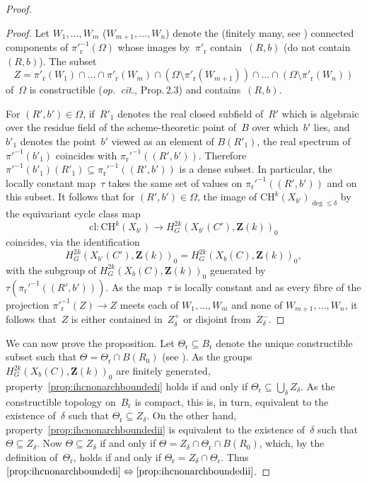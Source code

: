 \documentclass[JEP,XML,SOM,Unicode]{cedram}
\theoremstyle{plain}
\theoremstyle{definition}
\numberwithin{equation}{section}
\newcommand{\cl}{{\mathrm{cl}}}
\newcommand{\rs}{{\mathrm{r}}}
\newcommand{\Z}{{\mathbf Z}}
\newcommand{\CH}{\mathrm{CH}}
\begin{document}
\begin{proof}
\begin{proof}
Let $W_1,\dots,W_m$ (\resp $W_{m+1},\dots,W_n$) denote the (finitely many,
see \cite[Cor.\,3.7]{costeroyspectrereel}) connected components of $\pi'^{-1}_\rs(\Omega)$
whose images by~$\pi'_\rs$ contain~$(R,b)$ (\resp do not contain~$(R,b)$).
The subset
\[
Z = \pi'_\rs(W_1) \cap \dots \cap \pi'_\rs (W_m) \cap (\Omega \setminus \pi'_\rs(W_{m+1})) \cap \dots \cap \left(\Omega \setminus \pi'_\rs(W_n)\right)
\]
of~$\Omega$ is constructible (\emph{op.\ cit.}, Prop.\,2.3)
and contains~$(R,b)$.

For $(R',b') \in \Omega$,
if~$R'_1$ denotes the real closed subfield of~$R'$ which is algebraic over
the residue field of the scheme-theoretic point of~$B$
over which~$b'$ lies, and~$b'_1$ denotes the point~$b'$ viewed as an element of $B(R'_1)$,
the real spectrum of $\pi'^{-1}(b'_1)$
coincides with $\pi_\rs'^{-1}((R',b'))$.
Therefore $\pi'^{-1}(b'_1)(R'_1) \subseteq \pi_\rs'^{-1}((R',b'))$ is a dense subset.
In particular, the locally constant map~$\tau$ takes the same set of values
on $\pi_\rs'^{-1}((R',b'))$ and on this subset.
It follows that
for $(R',b') \in \Omega$, the image of
$\CH^k(X_{b'})_{\deg\leq\delta}$ by
the equivariant cycle class map
\[
\cl:\CH^k(X_{b'}) \to H^{2k}_G(X_{b'}(C'),\Z(k))_0
\]
coincides, via the identification
\[
H^{2k}_G(X_{b'}(C'),\Z(k))_0=H^{2k}_G(X_b(C),\Z(k))_0,
\]
with the subgroup of
$H^{2k}_G(X_b(C),\Z(k))_0$
generated by $\tau(\pi_\rs'^{-1}((R',b')))$.
As the map~$\tau$ is locally constant
and as every fibre of the projection $\pi'^{-1}_\rs(Z) \to Z$
meets each of $W_1,\dots,W_m$
and none of $W_{m+1},\dots,W_n$,
it follows that~$Z$ is either contained in~$Z_\delta^+$ or disjoint from~$Z_\delta^-$.
\end{proof}

We can now prove the proposition.
Let $\Theta_\rs \subseteq B_\rs$ denote the unique constructible subset such that
$\Theta=\Theta_\rs \cap B(R_0)$
(see \cite[Prop.\,7.2.2\,(i)]{bcr}).
As the groups $H^{2k}_G(X_b(C),\Z(k))_0$ are finitely generated,
property~\eqref{prop:ihcnonarchboundedi} holds if and only if $\Theta_\rs \subseteq \bigcup_\delta Z_\delta$.
As the constructible topology on~$B_\rs$ is compact,
this is, in turn, equivalent to the existence of~$\delta$ such that $\Theta_\rs \subseteq Z_\delta$.
On the other hand, property~\eqref{prop:ihcnonarchboundedii} is equivalent to the existence of~$\delta$
such that $\Theta \subseteq Z_\delta$.
Now $\Theta \subseteq Z_\delta$ if and only if $\Theta=Z_\delta \cap \Theta_\rs \cap B(R_0)$,
which, by the definition of~$\Theta_\rs$, holds if and only if $\Theta_\rs=Z_\delta \cap \Theta_\rs$.
Thus $\eqref{prop:ihcnonarchboundedi}\Leftrightarrow\eqref{prop:ihcnonarchboundedii}$.
\end{proof}
\end{document}
